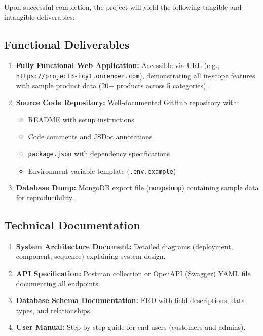 \documentclass[12pt, a4paper]{report}
\begin{document}
Upon successful completion, the project will yield the following tangible and intangible deliverables:

\subsection{Functional Deliverables}

\begin{enumerate}
    \item \textbf{Fully Functional Web Application:} Accessible via URL (e.g., \texttt{https://project3-icy1.onrender.com}), demonstrating all in-scope features with sample product data (20+ products across 5 categories).
    
    \item \textbf{Source Code Repository:} Well-documented GitHub repository with:
    \begin{itemize}
        \item README with setup instructions
        \item Code comments and JSDoc annotations
        \item \texttt{package.json} with dependency specifications
        \item Environment variable template (\texttt{.env.example})
    \end{itemize}
    
    \item \textbf{Database Dump:} MongoDB export file (\texttt{mongodump}) containing sample data for reproducibility.
\end{enumerate}

\subsection{Technical Documentation}

\begin{enumerate}
    \item \textbf{System Architecture Document:} Detailed diagrams (deployment, component, sequence) explaining system design.
    
    \item \textbf{API Specification:} Postman collection or OpenAPI (Swagger) YAML file documenting all endpoints.
    
    \item \textbf{Database Schema Documentation:} ERD with field descriptions, data types, and relationships.
    
    \item \textbf{User Manual:} Step-by-step guide for end users (customers and admins).
\end{enumerate}
\end{document}
